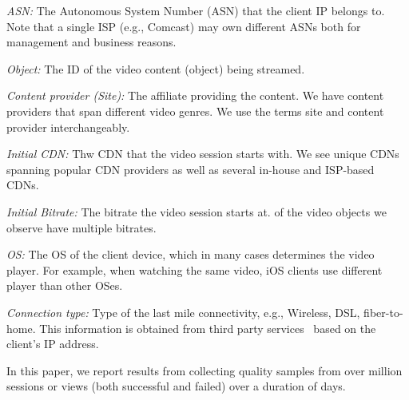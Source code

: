 \begin{packedenumerate}
\item \emph{ASN:} The Autonomous System Number (ASN) that the client
  IP belongs to. Note that a single ISP (e.g., Comcast) may own
  different ASNs both for management and business reasons.


\item \emph{Object:} The ID of the video content (object) being
  streamed.

\item \emph{Content provider (Site):} The affiliate providing the
  content. We have \fillme content providers that span different video
  genres.  We use the terms site and content provider interchangeably.

\item \emph{Initial CDN:} Thw CDN that the video session starts with.
  We see \fillme unique CDNs spanning popular CDN providers as well as
  several in-house and ISP-based CDNs. 

\item \emph{Initial Bitrate:} The bitrate the video session
  starts at. \fillme of the video objects we
  observe have multiple bitrates.

\item \emph{OS:} The OS of the client device, which in many cases
  determines the video player. For example, when watching the same
  video, iOS clients use different player than other OSes.

\item \emph{Connection type:} Type of the last mile connectivity,
  e.g., Wireless, DSL, fiber-to-home. This information is obtained
  from third party services~\cite{quova} based on the client's IP
  address.
\end{packedenumerate}

  In this paper, we report results from collecting quality samples
  from over \fillme million sessions or views (both successful and
  failed) over a duration of \fillme days.


